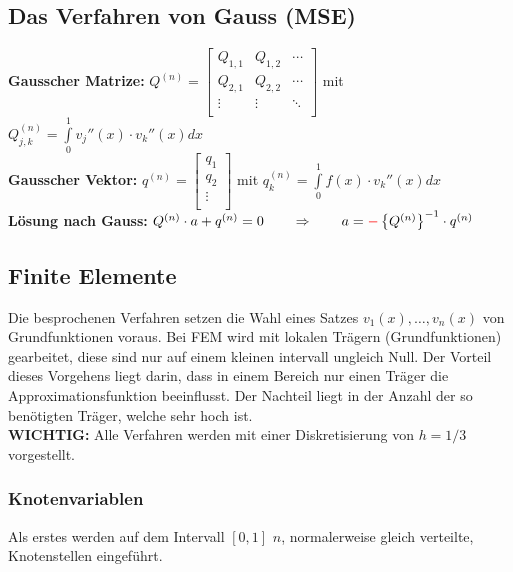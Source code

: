 \subsection{Das Verfahren von Gauss (MSE)}

\textbf{Gausscher Matrize: }
$Q^{(n)}=\begin{bmatrix}
	Q_{1,1}& Q_{1,2}&\cdots\\
	Q_{2,1}& Q_{2,2}&\cdots\\
	\vdots & \vdots &\ddots\\
\end{bmatrix}$ \qquad mit \qquad $Q_{j,k}^{(n)}=\int\limits_{0}^{1}{v_j''(x)\cdot v_k''(x) dx}$\\
\textbf{Gausscher Vektor: } 
$q^{(n)}=\begin{bmatrix}
	q_1\\
	q_2\\
	\vdots\\
\end{bmatrix}$ \qquad mit \qquad $q_{k}^{(n)}=\int\limits_{0}^{1}{f(x)\cdot v_k''(x) dx}$\\

\textbf{Lösung nach Gauss:} $Q^{(n)}\cdot a+q^{(n)}=0\qquad \Rightarrow \qquad a=\textcolor{red}{\mathbf{-}}\left\{Q^{(n)}\right\}^{-1}\cdot q^{(n)}$

\subsection{Finite Elemente}

Die besprochenen Verfahren setzen die Wahl eines Satzes $v_1(x),\ldots,v_n(x)$ von Grundfunktionen voraus. Bei FEM wird mit lokalen Trägern (Grundfunktionen) gearbeitet, diese sind nur auf einem kleinen intervall ungleich Null. Der Vorteil dieses Vorgehens liegt darin, dass in einem Bereich nur einen Träger die Approximationsfunktion beeinflusst. Der Nachteil liegt in der Anzahl der so benötigten Träger, welche sehr hoch ist.\\

\textbf{WICHTIG:} Alle Verfahren werden mit einer Diskretisierung von $h=1/3$
vorgestellt.

\subsubsection{Knotenvariablen}
Als erstes werden auf dem Intervall $[0,1]$ $n$, normalerweise gleich verteilte,   Knotenstellen eingeführt.

